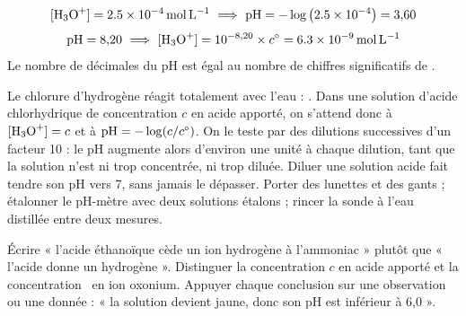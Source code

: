 \begin{savoirfaire}
\[\hho=\qty{2,5e-4}{mol.L^{-1}}\ \Longrightarrow\ \pH=-\log\left(\num{2.5e-4}\right)=3{,}60\]
\[\pH=8{,}20\ \Longrightarrow\ \hho=10^{-8{,}20}\times\cst=\qty{6,3e-9}{mol.L^{-1}}\]
Le nombre de décimales du pH est égal au nombre de chiffres significatifs de \hho.
\end{savoirfaire}
\begin{experience}
Le chlorure d'hydrogène réagit totalement avec l'eau : .
Dans une solution d'acide chlorhydrique de concentration $c$ en acide apporté, on s'attend donc à
$\hho=c$ et à $\mathrm{pH}=-\log(c/c^{\circ})$. On le teste par des dilutions successives d'un facteur 10 :
le pH augmente alors d'environ une unité à chaque dilution, tant que la solution n'est ni trop
concentrée, ni trop diluée. Diluer une solution acide fait tendre son pH vers 7, sans jamais le dépasser.
\vspace{1.5mm}
Porter des lunettes et des gants ; étalonner le pH-mètre avec deux solutions étalons ; rincer
la sonde à l'eau distillée entre deux mesures.
\end{experience}
\begin{rediger}
Écrire « l'acide éthanoïque cède un ion hydrogène à l'ammoniac » plutôt que « l'acide donne un
hydrogène ». Distinguer la concentration $c$ en acide apporté et la concentration \hho\ en ion
oxonium. Appuyer chaque conclusion sur une observation ou une donnée : « la solution devient
jaune, donc son pH est inférieur à 6,0 ».
\end{rediger}
\exercices

